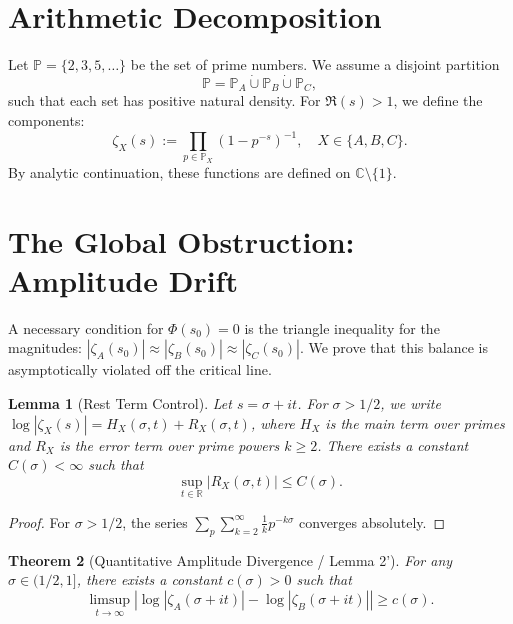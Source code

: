 \documentclass[a4paper,11pt]{article}
\newtheorem{theorem}{Theorem}[section]
\newtheorem{lemma}[theorem]{Lemma}
\begin{document}
\section{Arithmetic Decomposition}
Let $\mathbb{P} = \{2, 3, 5, \dots\}$ be the set of prime numbers. We assume a disjoint partition
\begin{equation}
    \mathbb{P} = \mathbb{P}_A \dot{\cup} \mathbb{P}_B \dot{\cup} \mathbb{P}_C,
\end{equation}
such that each set has positive natural density. For $\Re(s) > 1$, we define the components:
\begin{equation}
    \zeta_X(s) := \prod_{p \in \mathbb{P}_X} (1 - p^{-s})^{-1}, \quad X \in \{A, B, C\}.
\end{equation}
By analytic continuation, these functions are defined on $\mathbb{C} \setminus \{1\}$.

\section{The Global Obstruction: Amplitude Drift}
A necessary condition for $\Phi(s_0) = 0$ is the triangle inequality for the magnitudes: $|\zeta_A(s_0)| \approx |\zeta_B(s_0)| \approx |\zeta_C(s_0)|$. We prove that this balance is asymptotically violated off the critical line.

\begin{lemma}[Rest Term Control]
Let $s = \sigma + it$. For $\sigma > 1/2$, we write $\log|\zeta_X(s)| = H_X(\sigma, t) + R_X(\sigma, t)$, where $H_X$ is the main term over primes and $R_X$ is the error term over prime powers $k \ge 2$. There exists a constant $C(\sigma) < \infty$ such that
\begin{equation}
    \sup_{t \in \mathbb{R}} |R_X(\sigma, t)| \le C(\sigma).
\end{equation}
\end{lemma}

\begin{proof}
For $\sigma > 1/2$, the series $\sum_p \sum_{k=2}^\infty \frac{1}{k} p^{-k\sigma}$ converges absolutely.
\end{proof}

\begin{theorem}[Quantitative Amplitude Divergence / Lemma 2']
For any $\sigma \in (1/2, 1]$, there exists a constant $c(\sigma) > 0$ such that
\begin{equation}
    \limsup_{t \to \infty} \left| \log|\zeta_A(\sigma+it)| - \log|\zeta_B(\sigma+it)| \right| \ge c(\sigma).
\end{equation}
\end{theorem}
\end{document}
